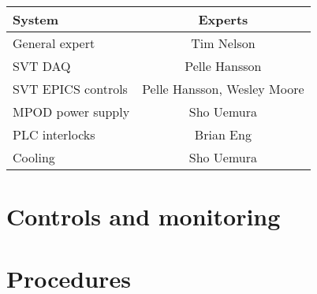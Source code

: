 \documentclass[12pt]{report}
\begin{document}
\begin{center}
    \begin{tabular}{lc}
        \hline \hline 
        System & Experts \\
        \hline
        General expert & Tim Nelson \\
        SVT DAQ & Pelle Hansson \\
        SVT EPICS controls & Pelle Hansson, Wesley Moore \\
        MPOD power supply & Sho Uemura \\
        PLC interlocks & Brian Eng \\
        Cooling & Sho Uemura \\
        \hline \hline
    \end{tabular}
\end{center}

\chapter{Controls and monitoring}



\chapter{Procedures}


\end{document}
